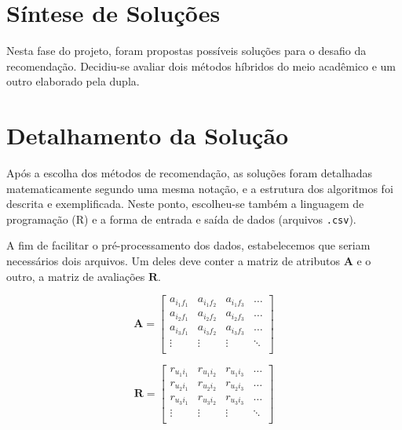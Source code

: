 \section{Síntese de Soluções} %
\label{sec:s_ntese_de_solu_es}


Nesta fase do projeto, foram propostas possíveis soluções para o desafio da recomendação. Decidiu-se avaliar dois métodos híbridos do meio acadêmico e um outro elaborado pela dupla. 

\section{Detalhamento da Solução} %
\label{sec:detalhamento_da_solu_o}


Após a escolha dos métodos de recomendação, as soluções foram detalhadas matematicamente segundo uma mesma notação, e a estrutura dos algoritmos foi descrita e exemplificada. Neste ponto, escolheu-se também a linguagem de programação (R) e a forma de entrada e saída de dados (arquivos \texttt{.csv}).

A fim de facilitar o pré-processamento dos dados, estabelecemos que seriam necessários dois arquivos. Um deles deve conter a matriz de atributos $\mathbf{A}$ e o outro, a matriz de avaliações  $\mathbf{R}$. 

\begin{equation} 
\mathbf{A} = 
\begin{bmatrix} 
 a_{i_1 f_1} &  a_{i_1 f_2} &  a_{i_1 f_3}  & \dots   \\
 a_{i_2 f_1} &  a_{i_2 f_2} &  a_{i_2 f_3}  & \dots   \\
 a_{i_3 f_1} &  a_{i_3 f_2} &  a_{i_3 f_3}  & \dots  \\ 
 \vdots &  \vdots &  \vdots  & \ddots   \\
 \end{bmatrix}
\end{equation}


\begin{equation}
	  \mathbf{R} = 
\begin{bmatrix} 
  r_{u_1 i_1} &  r_{u_1 i_2} &  r_{u_1 i_3}  & \dots   \\
 r_{u_2 i_1} &  r_{u_2 i_2} &  r_{u_2 i_3}  & \dots   \\
 r_{u_3 i_1} &  r_{u_3 i_2} &  r_{u_3 i_3}  & \dots  \\ 
 \vdots &  \vdots &  \vdots  & \ddots   \\
\end{bmatrix}
\end{equation}

